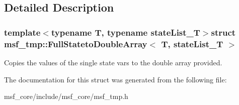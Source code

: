 \subsection{Detailed Description}
\subsubsection*{template$<$typename T, typename state\-List\-\_\-\-T$>$struct msf\-\_\-tmp\-::\-Full\-Stateto\-Double\-Array$<$ T, state\-List\-\_\-\-T $>$}

Copies the values of the single state vars to the double array provided. 

The documentation for this struct was generated from the following file\-:\begin{DoxyCompactItemize}
\item 
msf\-\_\-core/include/msf\-\_\-core/msf\-\_\-tmp.\-h\end{DoxyCompactItemize}
